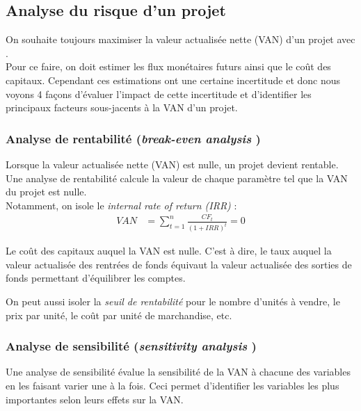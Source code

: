 \documentclass[10pt, french]{article}
\begin{document}
\begin{multicols*}{2}
\columnbreak
\subsection{Analyse du risque d'un projet}

On souhaite toujours maximiser la valeur actualisée nette (VAN) d'un projet avec .\\

Pour ce faire, on doit estimer les flux monétaires futurs ainsi que le coût des capitaux. Cependant ces estimations ont une certaine incertitude et donc nous voyons 4 façons d'évaluer l'impact de cette incertitude et d'identifier les principaux facteurs sous-jacents à la VAN d'un projet.


\subsubsection{Analyse de rentabilité (\og \textit{break-even analysis} \fg{})}
Lorsque la valeur actualisée nette (VAN) est nulle, un projet devient rentable.\\
Une analyse de rentabilité calcule la valeur de chaque paramètre tel que la VAN du projet est nulle. \\

Notamment, on isole le \og \textit{internal rate of return (IRR)} \fg{}:
\begin{align*}
	VAN
	&=	\sum_{t	=	1}^{n}\frac{CF_{t}}{(1	+	IRR)^{t}}
	=	0
\end{align*}

\begin{definitionNOHFILLsub}
Le coût des capitaux auquel la VAN est nulle. C'est à dire, le taux auquel la valeur actualisée des rentrées de fonds équivaut la valeur actualisée des sorties de fonds permettant d'équilibrer les comptes.
\end{definitionNOHFILLsub}

On peut aussi isoler la \textit{seuil de rentabilité} pour le nombre d'unités à vendre, le prix par unité, le coût par unité de marchandise, etc.


\subsubsection{Analyse de sensibilité (\og \textit{sensitivity analysis} \fg{})}
Une analyse de sensibilité évalue la sensibilité de la VAN à chacune des variables en les faisant varier une à la fois. Ceci permet d'identifier les variables les plus importantes selon leurs effets sur la VAN.\\


\end{multicols*}
\end{document}
